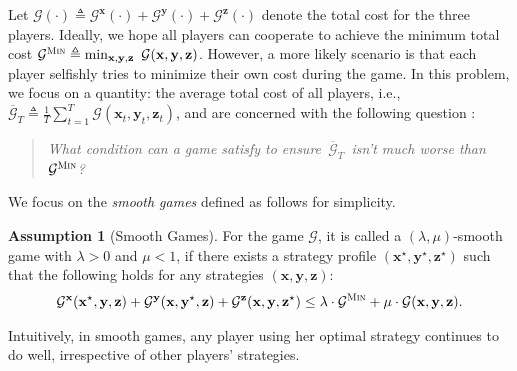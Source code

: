 \documentclass[a4paper]{article}
\numberwithin{equation}{section}
\theoremstyle{definition}
\theoremstyle{definition}
\newtheorem{myAssume}{Assumption}
\def \G {\mathcal{G}}
\def \x {\textbf{x}}
\def \xs {\x^\star}
\def \y {\textbf{y}}
\def \z {\textbf{z}}
\def \ys {\y^\star}
\def \zs {\z^\star}
\def \Gx {\mathcal{G}^\x}
\def \Gy {\mathcal{G}^\y}
\def \Gz {\mathcal{G}^\z}
\begin{document}
Let $\G(\cdot)\triangleq\Gx(\cdot)+\Gy(\cdot)+\Gz(\cdot)$ denote the total cost for the three players. Ideally, we hope all players can cooperate to achieve the minimum total cost $\G^\textsc{Min} \triangleq \min_{\x,\y,\z}~\G(\x, \y, \z)$. However, a more likely scenario is that each player selfishly tries to minimize their own cost during the game. In this problem, we focus on a quantity: the average total cost of all players, i.e., $\overline{\G}_T\triangleq\frac{1}{T}\sum_{t=1}^T \G(\x_t,\y_t,\z_t)$, and are concerned with the following question :
\begin{quote}
  \begin{center}
  \textit{What condition can a game satisfy to ensure~$\overline{\G}_T$~isn't much worse than~$\G^\textsc{Min}$?} 
  \end{center}
\end{quote}

We focus on the \emph{smooth games} defined as follows for simplicity.
\begin{tcolorbox}[top=0pt, bottom=0pt]
\begin{myAssume}[Smooth Games]
    \label{assumption:smooth-game}
    For the game $\G$, it is called a $(\lambda,\mu)$-smooth game with $\lambda>0$ and $\mu<1$, if there exists a strategy profile $(\xs,\ys,\zs)$ such that the following holds for any strategies $(\x,\y,\z)$:
    \begin{align}
    \label{eq:game-condition}
    \Gx(\xs, \y, \z) + \Gy(\x, \ys, \z) + \Gz(\x, \y, \zs) \le \lambda \cdot \G^\textsc{Min} + \mu \cdot \G(\x, \y, \z).
  \end{align}
\end{myAssume}
\end{tcolorbox}
Intuitively, in smooth games, any player using her optimal strategy continues to do well, irrespective of other players' strategies. 
\end{document}
